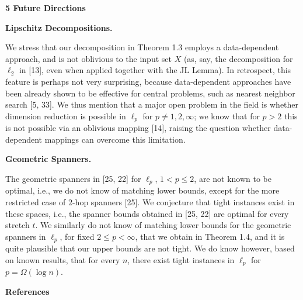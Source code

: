 \documentclass[10pt,a4paper]{amsart}
\begin{document}
\par
\par
\par\medskip\noindent\textbf{5 Future Directions}\par
\par\medskip\noindent\textbf{Lipschitz Decompositions.}\par
We stress that our decomposition in Theorem 1.3 employs a data-dependent approach, and is not oblivious to the input set $X$ (as, say, the decomposition for $\ell_{2}$ in [13], even when applied together with the JL Lemma). In retrospect, this feature is perhaps not very surprising, because data-dependent approaches have been already shown to be effective for central problems, such as nearest neighbor search [5, 33]. We thus mention that a major open problem in the field is whether dimension reduction is possible in $\ell_{p}$ for $p\neq 1,2,\infty$; we know that for $p>2$ this is not possible via an oblivious mapping [14], raising the question whether data-dependent mappings can overcome this limitation.
\par
\par
\par
\par\medskip\noindent\textbf{Geometric Spanners.}\par
The geometric spanners in [25, 22] for $\ell_{p}$, $1<p\leq 2$, are not known to be optimal, i.e., we do not know of matching lower bounds, except for the more restricted case of $2$-hop spanners [25]. We conjecture that tight instances exist in these spaces, i.e., the spanner bounds obtained in [25, 22] are optimal for every stretch $t$. We similarly do not know of matching lower bounds for the geometric spanners in $\ell_{p}$, for fixed $2\leq p<\infty$, that we obtain in Theorem 1.4, and it is quite plausible that our upper bounds are not tight. We do know however, based on known results, that for every $n$, there exist tight instances in $\ell_{p}$ for $p=\Omega(\log{n})$.
\par
\par
\par
\par\medskip\noindent\textbf{References}\par
\end{document}
